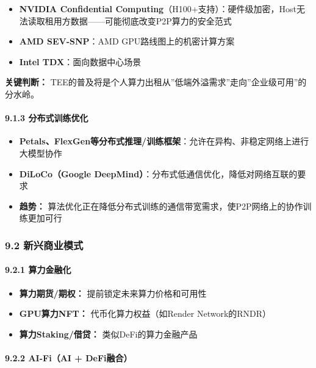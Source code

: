 \documentclass[UTF8,a4paper,12pt]{ctexart}
\begin{document}
\begin{itemize}
\tightlist
\item
  \textbf{NVIDIA Confidential
  Computing}（H100+支持）：硬件级加密，Host无法读取租用方数据------可能彻底改变P2P算力的安全范式
\item
  \textbf{AMD SEV-SNP}：AMD GPU路线图上的机密计算方案
\item
  \textbf{Intel TDX}：面向数据中心场景
\end{itemize}

\textbf{关键判断：}
TEE的普及将是个人算力出租从''低端外溢需求''走向''企业级可用''的分水岭。

\paragraph{9.1.3
分布式训练优化}\label{ux5206ux5e03ux5f0fux8badux7ec3ux4f18ux5316}

\begin{itemize}
\tightlist
\item
  \textbf{Petals、FlexGen等分布式推理/训练框架}：允许在异构、非稳定网络上进行大模型协作
\item
  \textbf{DiLoCo（Google
  DeepMind）}：分布式低通信优化，降低对网络互联的要求
\item
  \textbf{趋势：}
  算法优化正在降低分布式训练的通信带宽需求，使P2P网络上的协作训练更加可行
\end{itemize}

\subsubsection{9.2
新兴商业模式}\label{ux65b0ux5174ux5546ux4e1aux6a21ux5f0f}

\paragraph{9.2.1 算力金融化}\label{ux7b97ux529bux91d1ux878dux5316}

\begin{itemize}
\tightlist
\item
  \textbf{算力期货/期权：} 提前锁定未来算力价格和可用性
\item
  \textbf{GPU算力NFT：} 代币化算力权益（如Render Network的RNDR）
\item
  \textbf{算力Staking/借贷：} 类似DeFi的算力金融产品
\end{itemize}

\paragraph{9.2.2 AI-Fi（AI + DeFi融合）}\label{ai-fiai-defiux878dux5408}
\end{document}
